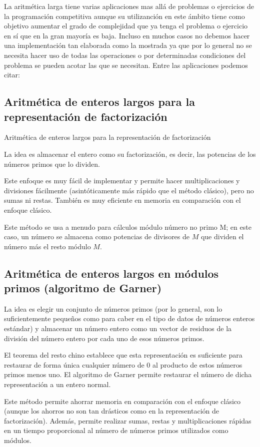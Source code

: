 La aritmética larga tiene varias aplicaciones mas allá de problemas o ejercicios de la programación competitiva aunque su utilizanción en este ámbito tiene como objetivo aumentar el grado de complejidad que ya tenga el problema o ejercicio en sí que en la gran mayoría es baja. Incluso en muchos casos no debemos hacer una implementación tan elaborada como la mostrada ya que por lo general no se necesita hacer uso de todas las operaciones o por determinadas condiciones del problema se pueden acotar las que se necesitan. Entre las aplicaciones podemos citar:

\subsection{Aritmética de enteros largos para la representación de factorización}

Aritmética de enteros largos para la representación de factorización

La idea es almacenar el entero como su factorización, es decir, las potencias de los números primos que lo dividen.

Este enfoque es muy fácil de implementar y permite hacer multiplicaciones y divisiones fácilmente (asintóticamente más rápido que el método clásico), pero no sumas ni restas. También es muy eficiente en memoria en comparación con el enfoque clásico.

Este método se usa a menudo para cálculos módulo número no primo M; en este caso, un número se almacena como potencias de divisores de $M$ que dividen el número más el resto módulo $M$.

\subsection{Aritmética de enteros largos en módulos primos (algoritmo de Garner)}

La idea es elegir un conjunto de números primos (por lo general, son lo suficientemente pequeños como para caber en el tipo de datos de números enteros estándar) y almacenar un número entero como un vector de residuos de la división del número entero por cada uno de esos números primos.

El teorema del resto chino establece que esta representación es suficiente para restaurar de forma única cualquier número de 0 al producto de estos números primos menos uno. El algoritmo de Garner permite restaurar el número de dicha representación a un entero normal.

Este método permite ahorrar memoria en comparación con el enfoque clásico (aunque los ahorros no son tan drásticos como en la representación de factorización). Además, permite realizar sumas, restas y multiplicaciones rápidas en un tiempo proporcional al número de números primos utilizados como módulos.

